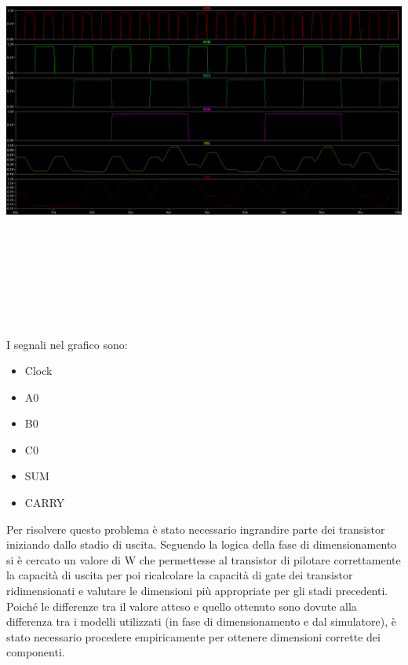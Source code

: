 \documentclass[12pt]{article} %
\begin{document}
\includegraphics[width = 160mm, height = 150mm]{Vecchio}
I segnali nel grafico sono:
\begin{itemize}
\item Clock
\item A0
\item B0
\item C0
\item SUM
\item CARRY
\end{itemize}

Per risolvere questo problema è stato necessario ingrandire parte dei transistor iniziando dallo stadio di uscita. Seguendo la logica della fase di dimensionamento si è cercato un valore di W che permettesse al transistor di pilotare correttamente la capacità di uscita per poi ricalcolare la capacità di gate dei transistor ridimensionati e valutare le dimensioni più appropriate per gli stadi precedenti.\\
Poiché le differenze tra il valore atteso e quello ottenuto sono dovute alla differenza tra i modelli utilizzati (in fase di dimensionamento e dal simulatore), è stato necessario procedere empiricamente per ottenere dimensioni corrette dei componenti.
\end{document}
